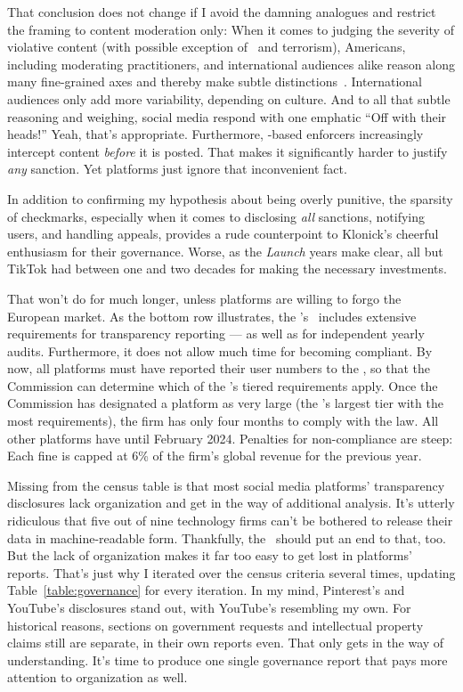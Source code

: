 That conclusion does not change if I avoid the damning analogues and restrict
the framing to content moderation only: When it comes to judging the severity of
violative content (with possible exception of \CSAM\ and terrorism), Americans,
including moderating practitioners, and international audiences alike reason
along many fine-grained axes and thereby make subtle
distinctions~\cite{JiangScheuermanea2021,ScheuermanJiangea2021}. International
audiences only add more variability, depending on culture. And to all that
subtle reasoning and weighing, social media respond with one emphatic ``Off with
their heads!'' Yeah, that's appropriate. Furthermore, \AI-based enforcers
increasingly intercept content \emph{before} it is posted. That makes it
significantly harder to justify \emph{any} sanction. Yet platforms just ignore
that inconvenient fact.

In addition to confirming my hypothesis about being overly punitive, the
sparsity of checkmarks, especially when it comes to disclosing \emph{all}
sanctions, notifying users, and handling appeals, provides a rude counterpoint
to Klonick's cheerful enthusiasm for their governance. Worse, as the
\emph{Launch} years make clear, all but TikTok had between one and two decades
for making the necessary investments.

That won't do for much longer, unless platforms are willing to forgo the
European market. As the bottom row illustrates, the \EU's \DSA\ includes
extensive requirements for transparency reporting --- as well as for independent
yearly audits. Furthermore, it does not allow much time for becoming compliant.
By now, all platforms must have reported their user numbers to the \EU, so that
the Commission can determine which of the \DSA's tiered requirements apply. Once
the Commission has designated a platform as very large (the \DSA's largest tier
with the most requirements), the firm has only four months to comply with the
law. All other platforms have until February 2024. Penalties for non-compliance
are steep: Each fine is capped at 6\% of the firm's global revenue for the
previous year.

Missing from the census table is that most social media platforms' transparency
disclosures lack organization and get in the way of additional analysis. It's
utterly ridiculous that five out of nine technology firms can't be bothered to
release their data in machine-readable form. Thankfully, the \DSA\ should put an
end to that, too. But the lack of organization makes it far too easy to get lost
in platforms' reports. That's just why I iterated over the census criteria
several times, updating Table~\ref{table:governance} for every iteration. In my
mind, Pinterest's and YouTube's disclosures stand out, with YouTube's resembling
my own. For historical reasons, sections on government requests and intellectual
property claims still are separate, in their own reports even. That only gets in
the way of understanding. It's time to produce one single governance report that
pays more attention to organization as well.

